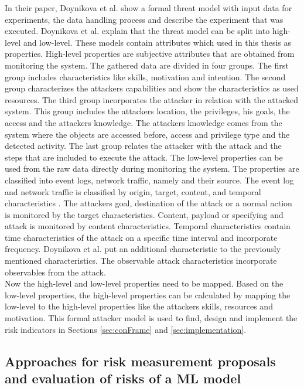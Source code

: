 In their paper, Doynikova et al. \cite{DBLP:conf/crisis/DoynikovaNGK20} show a formal threat model with input data for experiments, the data handling process and describe the experiment
that was executed. Doynikova et al. explain that the threat model can be split into high-level and low-level. These models contain attributes which used in this thesis as properties.
High-level properties are subjective attributes that are obtained from monitoring the system. The gathered data are divided in four groups. The first group includes characteristics like
skills, motivation and intention. The second group characterizes the attackers capabilities and show the characteristics as used resources. The third group incorporates the attacker in
relation with the attacked system. This group includes the attackers location, the privileges, his goals, the access and the attackers knowledge. The attackers knowledge comes from the
system where the objects are accessed before, access and privilege type and the detected activity. The last group relates the attacker with the attack and the steps that are included to
execute the attack. The low-level properties can be used from the raw data directly during monitoring the system. The properties are classified into event logs, network traffic, namely
and their source. The event log and network traffic is classified by origin, target, content, and temporal characteristics \cite{DBLP:journals/ijcysa/FraunholzKAS17}. The attackers
goal, destination of the attack or a normal action is monitored by the target characteristics. Content, payload or specifying and attack is monitored by content characteristics. Temporal
characteristics contain time characteristics of the attack on a specific time interval and incorporate frequency. Doynikova et al. put an additional characteristic to the previously
mentioned characteristics. The observable attack characteristics incorporate observables from the attack. \\
Now the high-level and low-level properties need to be mapped. Based on the low-level properties, the high-level properties can be calculated by mapping the low-level to the high-level
properties like the attackers skills, resources and motivation. This formal attacker model is used to find, design and implement the risk indicators in Sections \ref{sec:conFrame} and
\ref{sec:implementation}.

\subsection{Approaches for risk measurement proposals and evaluation of risks of a ML model}
\label{sec:approaches}


